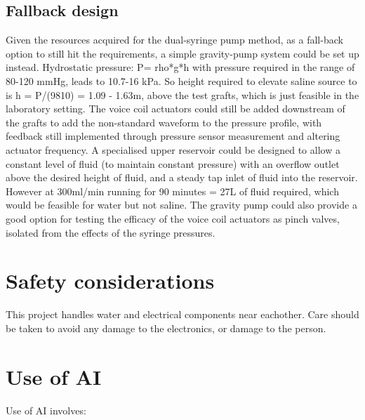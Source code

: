 \documentclass[10pt, a4paper]{article}
\begin{document}
\subsection{Fallback design}

Given the resources acquired for the dual-syringe pump method, as a fall-back option to still hit the requirements, a simple gravity-pump system could be set up instead. Hydrostatic pressure: P= rho*g*h with pressure required in the range of 80-120 mmHg, leads to 10.7-16 kPa. So height required to elevate saline source to is h = P/(9810) = 1.09 - 1.63m, above the test grafts, which is just feasible in the laboratory setting. The voice coil actuators could still be added downstream of the grafts to add the non-standard waveform to the pressure profile, with feedback still implemented through pressure sensor measurement and altering actuator frequency. A specialised upper reservoir could be designed to allow a constant level of fluid (to maintain constant pressure) with an overflow outlet above the desired height of fluid, and a steady tap inlet of fluid into the reservoir. However at 300ml/min running for 90 minutes = 27L of fluid required, which would be feasible for water but not saline. The gravity pump could also provide a good option for testing the efficacy of the voice coil actuators as pinch valves, isolated from the effects of the syringe pressures.

\section{Safety considerations}
This project handles water and electrical components near eachother. Care should be taken to avoid any damage to the electronics, or damage to the person.


\section{Use of AI}

Use of AI involves:
\end{document}
